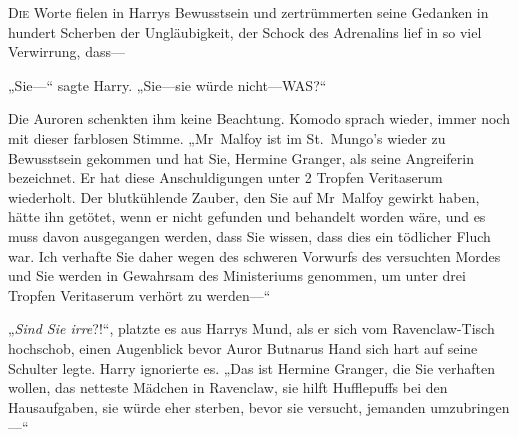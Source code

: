 
\lettrine{D}{ie} Worte fielen in Harrys Bewusstsein und zertrümmerten seine Gedanken in hundert Scherben der Ungläubigkeit, der Schock des Adrenalins lief in so viel Verwirrung, dass—

„Sie—“ sagte Harry. „Sie—sie würde nicht—WAS?“

Die Auroren schenkten ihm keine Beachtung. Komodo sprach wieder, immer noch mit dieser farblosen Stimme. „Mr~Malfoy ist im St.~Mungo’s wieder zu Bewusstsein gekommen und hat Sie, Hermine Granger, als seine Angreiferin bezeichnet. Er hat diese Anschuldigungen unter 2 Tropfen Veritaserum wiederholt. Der blutkühlende Zauber, den Sie auf Mr~Malfoy gewirkt haben, hätte ihn getötet, wenn er nicht gefunden und behandelt worden wäre, und es muss davon ausgegangen werden, dass Sie wissen, dass dies ein tödlicher Fluch war. Ich verhafte Sie daher wegen des schweren Vorwurfs des versuchten Mordes und Sie werden in Gewahrsam des Ministeriums genommen, um unter drei Tropfen Veritaserum verhört zu werden—“

„\emph{Sind Sie irre}?!“, platzte es aus Harrys Mund, als er sich vom Ravenclaw-Tisch hochschob, einen Augenblick bevor Auror Butnarus Hand sich hart auf seine Schulter legte. Harry ignorierte es. „Das ist Hermine Granger, die Sie verhaften wollen, das netteste Mädchen in Ravenclaw, sie hilft Hufflepuffs bei den Hausaufgaben, sie würde eher sterben, bevor sie versucht, jemanden umzubringen—“

